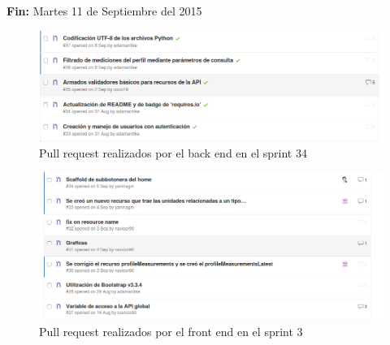 \documentclass[a4paper,12pt]{article}
\begin{document}
\textbf{Fin:} Martes 11 de Septiembre del 2015

\begin{figure}[h!]
  \centering
  \includegraphics[width=.8\textwidth]{img/4-PR_back}
  \caption{Pull request realizados por el back end en el sprint  34}
  \label{4-PR_back}
\end{figure}
\begin{figure}[h!]
  \centering
  \includegraphics[width=.8\textwidth]{img/4-PR_front}
  \caption{Pull request realizados por el front end en el sprint  3}
  \label{4-PR_front}
\end{figure}
\end{document}
